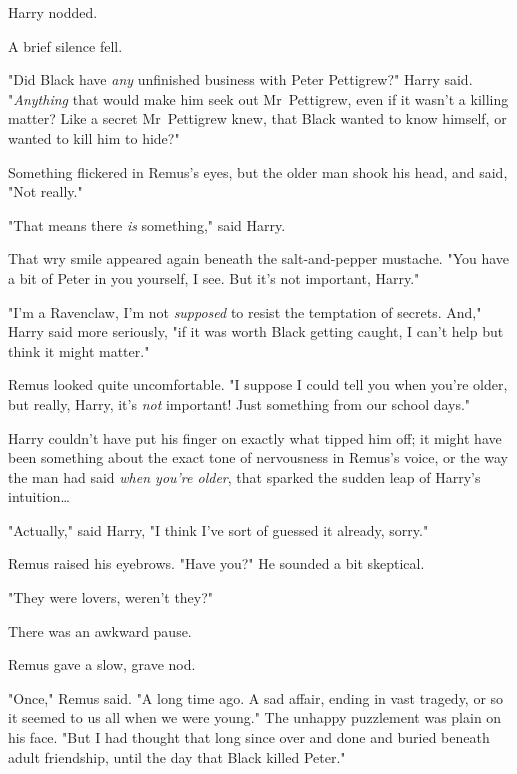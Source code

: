 Harry nodded.

A brief silence fell.

"Did Black have \emph{any} unfinished business with Peter Pettigrew?" Harry
said. "\emph{Anything} that would make him seek out Mr~Pettigrew, even if it
wasn't a killing matter? Like a secret Mr~Pettigrew knew, that Black wanted to
know himself, or wanted to kill him to hide?"

Something flickered in Remus's eyes, but the older man shook his head, and
said, "Not really."

"That means there \emph{is} something," said Harry.

That wry smile appeared again beneath the salt-and-pepper mustache. "You have a
bit of Peter in you yourself, I see. But it's not important, Harry."

"I'm a Ravenclaw, I'm not \emph{supposed} to resist the temptation of secrets.
And," Harry said more seriously, "if it was worth Black getting caught, I can't
help but think it might matter."

Remus looked quite uncomfortable. "I suppose I could tell you when you're
older, but really, Harry, it's \emph{not} important! Just something from our
school days."

Harry couldn't have put his finger on exactly what tipped him off; it might
have been something about the exact tone of nervousness in Remus's voice, or
the way the man had said \emph{when you're older}, that sparked the sudden leap
of Harry's intuition…

"Actually," said Harry, "I think I've sort of guessed it already, sorry."

Remus raised his eyebrows. "Have you?" He sounded a bit skeptical.

"They were lovers, weren't they?"

There was an awkward pause.

Remus gave a slow, grave nod.

"Once," Remus said. "A long time ago. A sad affair, ending in vast tragedy, or
so it seemed to us all when we were young." The unhappy puzzlement was plain on
his face. "But I had thought that long since over and done and buried beneath
adult friendship, until the day that Black killed Peter."

